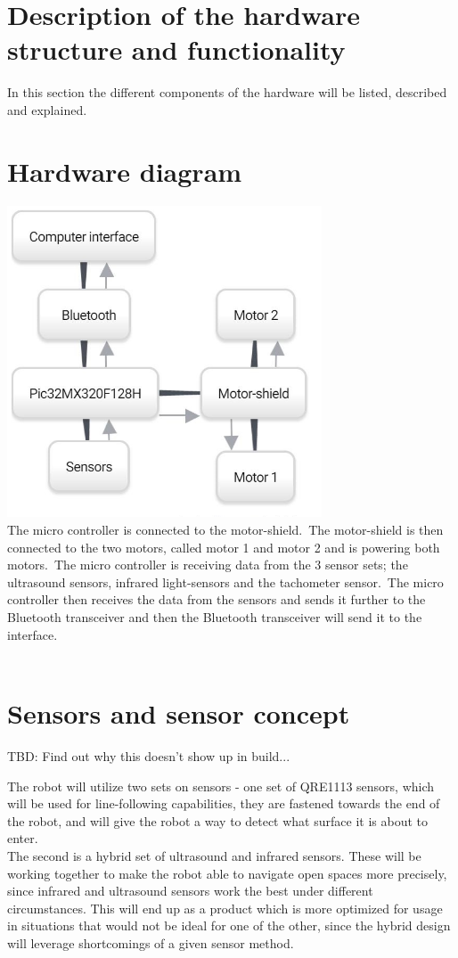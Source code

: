 \section{Description of the hardware structure and functionality}

In this section the different components of the hardware will be listed, described and explained.\


\section{Hardware diagram}
\includegraphics[width=0.7\textwidth]{figures/hardwareDIA.jpg} \\

The micro controller is connected to the motor-shield.\ The motor-shield is then connected to the two motors, called motor 1 and motor 2 and is powering both motors.\ The micro controller is receiving data from the 3 sensor sets; the ultrasound sensors, infrared light-sensors and the tachometer sensor.\ The micro controller then receives the data from the sensors and sends it further to the Bluetooth transceiver and then the Bluetooth transceiver will send it to the interface. \\ \\

\section{Sensors and sensor concept}

TBD: Find out why this doesn't show up in build...

The robot will utilize two sets on sensors - one set of QRE1113 sensors, which will be used for line-following capabilities, they are fastened towards the end of the robot, and will give the robot a way to detect what surface it is about to enter.\\
The second is a hybrid set of ultrasound and infrared sensors. These will be working together to make the robot able to navigate open spaces more precisely, since infrared and ultrasound sensors work the best under different circumstances. This will end up as a product which is more optimized for usage in situations that would not be ideal for one of the other, since the hybrid design will leverage shortcomings of a given sensor method.\\

